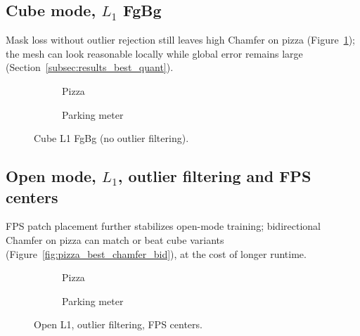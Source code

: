 \subsection{Cube mode, $L_1$ FgBg}
\label{subsec:ablation_cube_l1_fgbg}

Mask loss without outlier rejection still leaves high Chamfer on pizza (Figure~\ref{fig:ablation_cube_l1_fgbg_pizza}); the mesh can look reasonable locally while global error remains large (Section~\ref{subsec:results_best_quant}).

\begin{figure}[H]
    \centering
    \begin{subfigure}{\textwidth}
        \centering
        \caption{Pizza}
        \label{fig:ablation_cube_l1_fgbg_pizza}
    \end{subfigure}
    \vspace{0.6em}
    \begin{subfigure}{\textwidth}
        \centering
        \caption{Parking meter}
        \label{fig:ablation_cube_l1_fgbg_parking}
    \end{subfigure}
    \caption{Cube L1 FgBg (no outlier filtering).}
    \label{fig:ablation_cube_l1_fgbg}
\end{figure}

\subsection{Open mode, $L_1$, outlier filtering and FPS centers}
\label{subsec:ablation_open_l1_outliers_fps}

FPS patch placement further stabilizes open-mode training; bidirectional Chamfer on pizza can match or beat cube variants (Figure~\ref{fig:pizza_best_chamfer_bid}), at the cost of longer runtime.

\begin{figure}[H]
    \centering
    \begin{subfigure}{\textwidth}
        \centering
        \caption{Pizza}
        \label{fig:ablation_open_l1_out_fps_pizza}
    \end{subfigure}
    \vspace{0.6em}
    \begin{subfigure}{\textwidth}
        \centering
        \caption{Parking meter}
        \label{fig:ablation_open_l1_out_fps_parking}
    \end{subfigure}
    \caption{Open L1, outlier filtering, FPS centers.}
    \label{fig:ablation_open_l1_out_fps}
\end{figure}

